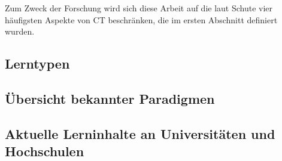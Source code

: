 
    Zum Zweck der Forschung wird sich diese Arbeit auf die laut Schute vier häufigsten Aspekte von CT beschränken, die im ersten Abschnitt definiert wurden.


\subsection{Lerntypen}

\subsection{Übersicht bekannter Paradigmen}

\subsection{Aktuelle Lerninhalte an Universitäten und Hochschulen}